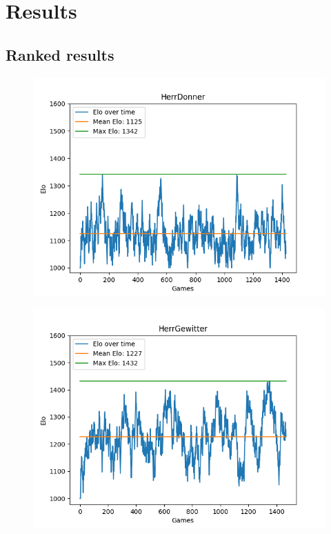 \section{Results}
\subsection{Ranked results}
\begin{figure}[h]
  \centering
  \begin{minipage}{.5\textwidth}
    \centering
    \includegraphics[width=1\linewidth]{images/Donner-Elo-Time.png}
    \label{fig:donner-elo}
  \end{minipage}%
  \begin{minipage}{.5\textwidth}
    \centering
    \includegraphics[width=1\linewidth]{images/Gewitter-Elo-Time.png}
    \label{fig:gewitter-elo}
  \end{minipage}
\end{figure}
